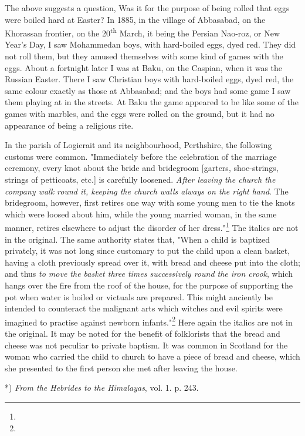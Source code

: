 \documentclass[a4paper, 11pt, oneside, polutonikogreek, english]{article}
\begin{document}
The above suggests a question, Was it for the purpose of being rolled that eggs were boiled hard at Easter? In 1885, in the village of Abbasabad, on the Khorassan frontier, on the 20\textsuperscript{th} March, it being the Persian Nao-roz, or New Year's Day, I saw Mohammedan boys, with hard-boiled eggs, dyed red. They did not roll them, but they amused themselves with some kind of games with the eggs. About a fortnight later I was at Baku, on the Caspian, when it was the Russian Easter. There I saw Christian boys with hard-boiled eggs, dyed red, the same colour exactly as those at Abbasabad; and the boys had some game I saw them playing at in the streets. At Baku the game appeared to be like some of the games with marbles, and the eggs were rolled on the ground, but it had no appearance of being a religious rite.

In the parish of Logierait and its neighbourhood, Perthshire, the following customs were common. "Immediately before the celebration of the marriage ceremony, every knot about the bride and bridegroom [garters, shoe-strings, strings of petticoats, etc.] is carefully loosened. \emph{After leaving the church the company walk round it, keeping the church walls always on the right hand}. The bridegroom, however, first retires one way with some young men to tie the knots which were loosed about him, while the young married woman, in the same manner, retires elsewhere to adjust the disorder of her dress."\footnote{} The italics are not in the original. The same authority states that, "When a child is baptized privately, it was not long since customary to put the child upon a clean basket, having a cloth previously spread over it, with bread and cheese put into the cloth; and thus \emph{to move the basket three times successively round the iron crook}, which hangs over the fire from the roof of the house, for the purpose of supporting the pot when water is boiled or victuals are prepared. This might anciently be intended to counteract the malignant arts which witches and evil spirits were imagined to practise against newborn infants."\footnote{} Here again the italics are not in the original. It may be noted for the benefit of folklorists that the bread and cheese was not peculiar to private baptism. It was common in Scotland for the woman who carried the child to church to have a piece of bread and cheese, which she presented to the first person she met after leaving the house.

*) \emph{From the Hebrides to the Himalayas}, vol. 1. p. 243.
\end{document}
